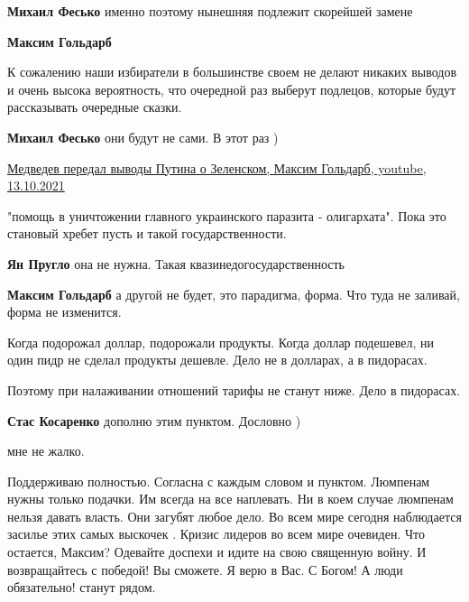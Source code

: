 \begin{itemize}
\begin{itemize} %
\textbf{Михаил Фесько} именно поэтому нынешняя подлежит скорейшей замене

\textbf{Максим Гольдарб}

К сожалению наши избиратели в большинстве своем не делают никаких выводов и
очень высока вероятность, что очередной раз выберут подлецов, которые будут
рассказывать очередные сказки.


\textbf{Михаил Фесько} они будут не сами. В этот раз )
\end{itemize} %

\href{https://youtu.be/p7GEmn6xOR0}{%
Медведев передал выводы Путина о Зеленском, Максим Гольдарб, youtube, 13.10.2021%
}


"помощь в уничтожении главного украинского паразита - олигархата". Пока это
становый хребет пусть и такой государственности.

\begin{itemize} %
\textbf{Ян Пругло} она не нужна. Такая квазинедогосударственность

\textbf{Максим Гольдарб} а другой не будет, это парадигма, форма. Что туда не заливай, форма не изменится.
\end{itemize} %


Когда подорожал доллар, подорожали продукты. Когда доллар подешевел, ни один
пидр не сделал продукты дешевле. Дело не в долларах, а в пидорасах.

Поэтому при налаживании отношений тарифы не станут ниже. Дело в пидорасах.

\begin{itemize} %
\textbf{Стас Косаренко} дополню этим пунктом. Дословно )

мне не жалко.
\end{itemize} %


Поддерживаю полностью. Согласна с каждым словом и пунктом. Люмпенам нужны
только подачки. Им всегда на все наплевать. Ни в коем случае люмпенам нельзя
давать власть. Они загубят любое дело. Во всем мире сегодня наблюдается засилье
этих самых выскочек . Кризис лидеров во всем мире очевиден. Что остается,
Максим? Одевайте доспехи и идите на свою священную войну. И возвращайтесь с
победой! Вы сможете. Я верю в Вас. С Богом! А люди обязательно! станут рядом.


\end{itemize}
